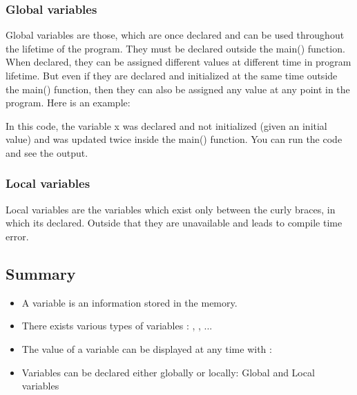 \documentclass[11pt, a4paper]{article}
\begin{document}
\subsubsection{Global variables}
Global variables are those, which are once declared and can be used throughout
the lifetime of the program. They must be declared
outside the main() function. When declared, they can be assigned different
values at different time in program lifetime. But even if they are declared and
initialized at the same time outside the main() function, then they can also be
assigned any value at any point in the program. Here is an example:

In this code, the variable x was declared and not initialized (given an initial value)
and was updated twice inside the main() function. You can run the code and see the output.

\subsubsection{Local variables}
Local variables are the variables which exist only between the curly braces,
in which its declared. Outside that they are unavailable and leads to compile time error.

\subsection{Summary}
\begin{itemize}
\item A variable is an information stored in the memory.
\item There exists various types of variables : , ,  ...
\item The value of a variable can be displayed at any time with : 
\item  Variables can be declared either globally or locally: Global and Local variables
\end{itemize}

\newpage
\end{document}
